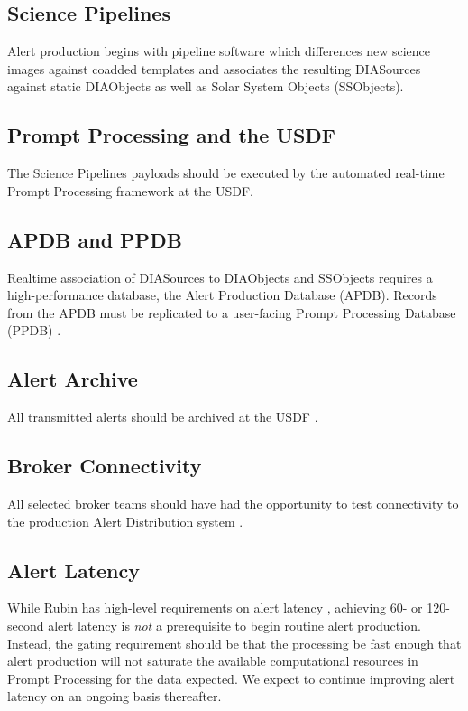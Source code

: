 \documentclass[OPS,authoryear,toc]{lsstdoc}
\begin{document}
\subsection{Science Pipelines}

Alert production begins with pipeline software which differences new science images against coadded templates and associates the resulting DIASources against static DIAObjects as well as Solar System Objects (SSObjects).

\subsection{Prompt Processing and the USDF}

The Science Pipelines payloads should be executed by the automated real-time Prompt Processing framework at the USDF.

\subsection{APDB and PPDB}

Realtime association of DIASources to DIAObjects and SSObjects requires a high-performance database, the Alert Production Database (APDB).
Records from the APDB must be replicated to a user-facing Prompt Processing Database (PPDB) .

\subsection{Alert Archive}

All transmitted alerts should be archived at the USDF .

\subsection{Broker Connectivity}

All selected broker teams  should have had the opportunity to test connectivity to the production Alert Distribution system .

\subsection{Alert Latency}

While Rubin has high-level requirements on alert latency , achieving 60- or 120-second alert latency is \textit{not} a prerequisite to begin routine alert production.
Instead, the gating requirement should be that the processing be fast enough that alert production will not saturate the available computational resources in Prompt Processing for the data expected.
We expect to continue improving alert latency on an ongoing basis thereafter.
\end{document}
